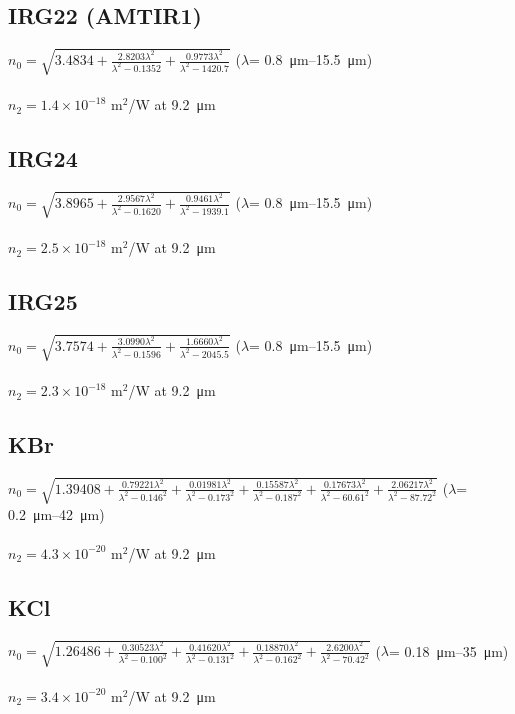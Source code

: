 \subsection*{IRG22 (AMTIR1)}
$n_0=\sqrt{3.4834+\frac{2.8203\lambda^2}{\lambda^2-0.1352}+\frac{0.9773\lambda^2}{\lambda^2-1420.7}}$ (\(\lambda\)= \SIrange{0.8}{15.5}{\micro\meter}) \cite{IRG22}\\
\\
$n_2 = 1.4\times 10^{-18}$ m$^2$/W at \SI{9.2}{\micro\meter} \cite{Polyanskiy-2023}

\subsection*{IRG24}
$n_0=\sqrt{3.8965+\frac{2.9567\lambda^2}{\lambda^2-0.1620}+\frac{0.9461\lambda^2}{\lambda^2-1939.1}}$ (\(\lambda\)= \SIrange{0.8}{15.5}{\micro\meter}) \cite{IRG24}\\
\\
$n_2 = 2.5\times 10^{-18}$ m$^2$/W at \SI{9.2}{\micro\meter} \cite{Polyanskiy-2023}

\subsection*{IRG25}
$n_0=\sqrt{3.7574+\frac{3.0990\lambda^2}{\lambda^2-0.1596}+\frac{1.6660\lambda^2}{\lambda^2-2045.5}}$ (\(\lambda\)= \SIrange{0.8}{15.5}{\micro\meter}) \cite{IRG25}\\
\\
$n_2 = 2.3\times 10^{-18}$ m$^2$/W at \SI{9.2}{\micro\meter} \cite{Polyanskiy-2023}

\subsection*{KBr}
$n_0=\sqrt{1.39408+\frac{0.79221\lambda^2}{\lambda^2-0.146^2}+\frac{0.01981\lambda^2}{\lambda^2-0.173^2}+\frac{0.15587\lambda^2}{\lambda^2-0.187^2}+\frac{0.17673\lambda^2}{\lambda^2-60.61^2}+\frac{2.06217\lambda^2}{\lambda^2-87.72^2}}$ (\(\lambda\)= \SIrange{0.2}{42}{\micro\meter}) \cite{Li-1976}\\
\\
$n_2 = 4.3 \times 10^{-20}$ m$^2$/W at \SI{9.2}{\micro\meter} \cite{Polyanskiy-2023}

\subsection*{KCl}
$n_0=\sqrt{1.26486+\frac{0.30523\lambda^2}{\lambda^2-0.100^2}+\frac{0.41620\lambda^2}{\lambda^2-0.131^2}+\frac{0.18870\lambda^2}{\lambda^2-0.162^2}+\frac{2.6200\lambda^2}{\lambda^2-70.42^2}}$ (\(\lambda\)= \SIrange{0.18}{35}{\micro\meter}) \cite{Li-1976}\\
\\
$n_2 = 3.4 \times 10^{-20}$ m$^2$/W at \SI{9.2}{\micro\meter} \cite{Polyanskiy-2021b}

